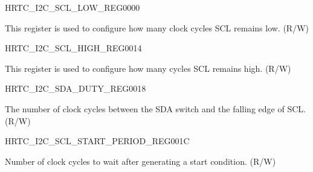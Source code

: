 \begin{register}{H}{RTC\_I2C\_SCL\_LOW\_REG}{\hexprefix{}0000}\label{regdesc:RTCI2CSCLLOWREG}
%
%
\regnewline%
\begin{regdesc}\begin{reglist}
\label{fielddesc:RTCI2CSCLLOWPERIODREG}\item [RTC\_I2C\_SCL\_LOW\_PERIOD\_REG] This register is used to configure how many clock cycles SCL remains low. (R/W)
\end{reglist}\end{regdesc}
\end{register}


\begin{register}{H}{RTC\_I2C\_SCL\_HIGH\_REG}{\hexprefix{}0014}\label{regdesc:RTCI2CSCLHIGHREG}
%
%
\regnewline%
\begin{regdesc}\begin{reglist}
\label{fielddesc:RTCI2CSCLHIGHPERIODREG}\item [RTC\_I2C\_SCL\_HIGH\_PERIOD\_REG] This register is used to configure how many cycles SCL remains high. (R/W)
\end{reglist}\end{regdesc}
\end{register}


\begin{register}{H}{RTC\_I2C\_SDA\_DUTY\_REG}{\hexprefix{}0018}\label{regdesc:RTCI2CSDADUTYREG}
%
%
\regnewline%
\begin{regdesc}\begin{reglist}
\label{fielddesc:RTCI2CSDADUTYNUM}\item [RTC\_I2C\_SDA\_DUTY\_NUM] The number of clock cycles between the SDA switch and the falling edge of SCL. (R/W)
\end{reglist}\end{regdesc}
\end{register}


\begin{register}{H}{RTC\_I2C\_SCL\_START\_PERIOD\_REG}{\hexprefix{}001C}\label{regdesc:RTCI2CSCLSTARTPERIODREG}
%
%
\regnewline%
\begin{regdesc}\begin{reglist}
\label{fielddesc:RTCI2CSCLSTARTPERIOD}\item [RTC\_I2C\_SCL\_START\_PERIOD] Number of clock cycles to wait after generating a start condition. (R/W)
\end{reglist}\end{regdesc}
\end{register}


